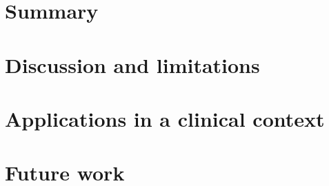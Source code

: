 \section{Summary}

\section{Discussion and limitations}

\section{Applications in a clinical context}

\section{Future work}
